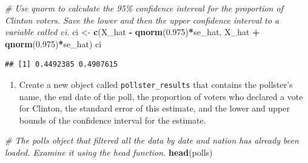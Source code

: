 \documentclass[
]{article}
\newenvironment{Shaded}{\begin{snugshade}}{\end{snugshade}}
\newcommand{\CommentTok}[1]{\textcolor[rgb]{0.56,0.35,0.01}{\textit{#1}}}
\newcommand{\FloatTok}[1]{\textcolor[rgb]{0.00,0.00,0.81}{#1}}
\newcommand{\KeywordTok}[1]{\textcolor[rgb]{0.13,0.29,0.53}{\textbf{#1}}}
\newcommand{\NormalTok}[1]{#1}
\newcommand{\OperatorTok}[1]{\textcolor[rgb]{0.81,0.36,0.00}{\textbf{#1}}}
\newcommand{\StringTok}[1]{\textcolor[rgb]{0.31,0.60,0.02}{#1}}
\providecommand{\tightlist}{%
  \setlength{\itemsep}{0pt}\setlength{\parskip}{0pt}}
\begin{document}
\begin{Shaded}
\begin{Highlighting}[]
\CommentTok{\# Use \textasciigrave{}qnorm\textasciigrave{} to calculate the 95\% confidence interval for the proportion of Clinton voters. Save the lower and then the upper confidence interval to a variable called \textasciigrave{}ci\textasciigrave{}.}
\NormalTok{ci \textless{}{-}}\StringTok{ }\KeywordTok{c}\NormalTok{(X\_hat }\OperatorTok{{-}}\StringTok{ }\KeywordTok{qnorm}\NormalTok{(}\FloatTok{0.975}\NormalTok{)}\OperatorTok{*}\NormalTok{se\_hat, X\_hat }\OperatorTok{+}\StringTok{ }\KeywordTok{qnorm}\NormalTok{(}\FloatTok{0.975}\NormalTok{)}\OperatorTok{*}\NormalTok{se\_hat)}
\NormalTok{ci}
\end{Highlighting}
\end{Shaded}

\begin{verbatim}
## [1] 0.4492385 0.4907615
\end{verbatim}

\begin{enumerate}
\def\labelenumi{\arabic{enumi}.}
\setcounter{enumi}{1}
\tightlist
\item
  Create a new object called \texttt{pollster\_results} that contains
  the pollster's name, the end date of the poll, the proportion of
  voters who declared a vote for Clinton, the standard error of this
  estimate, and the lower and upper bounds of the confidence interval
  for the estimate.
\end{enumerate}

\begin{Shaded}
\begin{Highlighting}[]
\CommentTok{\# The \textasciigrave{}polls\textasciigrave{} object that filtered all the data by date and nation has already been loaded. Examine it using the \textasciigrave{}head\textasciigrave{} function.}
\KeywordTok{head}\NormalTok{(polls)}
\end{Highlighting}
\end{Shaded}
\end{document}
